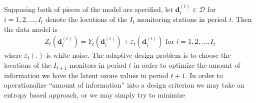 \documentclass[12pt]{article}
\begin{document}
Supposing both of pieces of the model are specified, let $\bm{d}^{(t)}_i\in \mathcal{D}$ for $i=1,2,\dots,I_t$ denote the locations of the $I_t$ monitoring stations in period $t$. Then the data model is
\begin{align*}
Z_t(\bm{d}_i^{(t)}) = Y_t(\bm{d}_i^{(t)}) + \varepsilon_t(\bm{d}_i^{(t)}) \mbox{ for } i=1,2,\dots,I_t
\end{align*}
where $\varepsilon_t(.)$ is white noise. The adaptive design problem is to choose the locations of the $I_{t+1}$ monitors in period $t$ in order to optimize the amount of information we have the latent ozone values in period $t+1$. In order to operationalize ``amount of information'' into a design criterion we may take an entropy based approach, or we may simply try to minimize
\clearpage\pagebreak\newpage\thispagestyle{empty}
%
\end{document}
